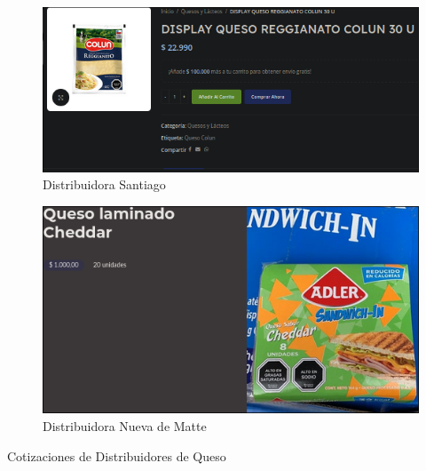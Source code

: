 \documentclass[12pt]{article}
\begin{document}
            \begin{subfigure}{0.45\textwidth}
                \centering
                \includegraphics[width=0.9\linewidth]{santiago} %
                \caption{Distribuidora Santiago}
                \label{fig:distribuidora_santiago}
            \end{subfigure}
            \begin{subfigure}{0.45\textwidth}
                \centering
                \includegraphics[width=0.9\linewidth]{nueva} %
                \caption{Distribuidora Nueva de Matte}
                \label{fig:distribuidora_nueva_de_matte}
            \end{subfigure}
            \caption{Cotizaciones de Distribuidores de Queso}
            \label{fig:cotizaciones_queso}
\end{document}
